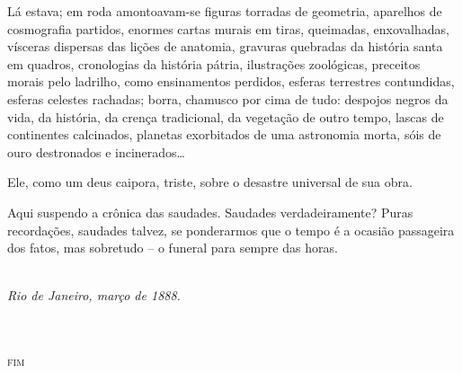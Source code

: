 Lá estava; em roda amontoavam{}-se
figuras torradas de geometria, aparelhos de cosmografia partidos,
enormes cartas murais em tiras, queimadas, enxovalhadas, vísceras
dispersas das lições de anatomia, gravuras quebradas da história santa
em quadros, cronologias da história pátria, ilustrações zoológicas,
preceitos morais pelo ladrilho, como ensinamentos perdidos, esferas
terrestres contundidas, esferas celestes rachadas; borra, chamusco por
cima de tudo: despojos negros da vida, da história, da crença
tradicional, da vegetação de outro tempo, lascas de continentes
calcinados, planetas exorbitados de uma astronomia morta, sóis de ouro
destronados e incinerados\ldots 

Ele, como um deus caipora, triste, sobre o
desastre universal de sua obra. 

Aqui suspendo a crônica das saudades.
Saudades verdadeiramente? Puras recordações, saudades talvez, se
ponderarmos que o tempo é a ocasião passageira dos fatos, mas sobretudo 
-- o funeral para sempre das horas.

\ \\

\textit{Rio de Janeiro, março de 1888.}\\
\  \\
\ \\
\begin{center}\textsc{fim}\end{center}
